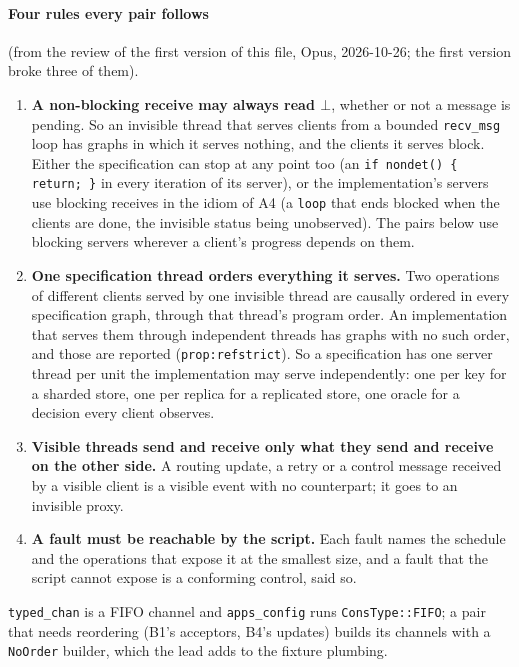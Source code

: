 \documentclass[11pt,a4paper]{article}
\newcommand{\code}[1]{\texttt{#1}}
\begin{document}
\paragraph{Four rules every pair follows} (from the review of the first version of this file,
Opus, 2026-10-26; the first version broke three of them).
\begin{enumerate}
  \item \textbf{A non-blocking receive may always read $\bot$}, whether or not a message is
        pending. So an invisible thread that serves clients from a bounded \code{recv\_msg}
        loop has graphs in which it serves nothing, and the clients it serves block. Either the
        specification can stop at any point too (an \code{if nondet() \{ return; \}} in every
        iteration of its server), or the implementation's servers use blocking receives in the
        idiom of A4 (a \code{loop} that ends blocked when the clients are done, the invisible
        status being unobserved). The pairs below use blocking servers wherever a client's
        progress depends on them.
  \item \textbf{One specification thread orders everything it serves.} Two operations of
        different clients served by one invisible thread are causally ordered in every
        specification graph, through that thread's program order. An implementation that
        serves them through independent threads has graphs with no such order, and those are
        reported (\code{prop:refstrict}). So a specification has one server thread per unit the
        implementation may serve independently: one per key for a sharded store, one per
        replica for a replicated store, one oracle for a decision every client observes.
  \item \textbf{Visible threads send and receive only what they send and receive on the other
        side.} A routing update, a retry or a control message received by a visible client is a
        visible event with no counterpart; it goes to an invisible proxy.
  \item \textbf{A fault must be reachable by the script.} Each fault names the schedule and the
        operations that expose it at the smallest size, and a fault that the script cannot
        expose is a conforming control, said so.
\end{enumerate}
\code{typed\_chan} is a FIFO channel and \code{apps\_config} runs \code{ConsType::FIFO}; a pair
that needs reordering (B1's acceptors, B4's updates) builds its channels with a \code{NoOrder}
builder, which the lead adds to the fixture plumbing.
\end{document}
